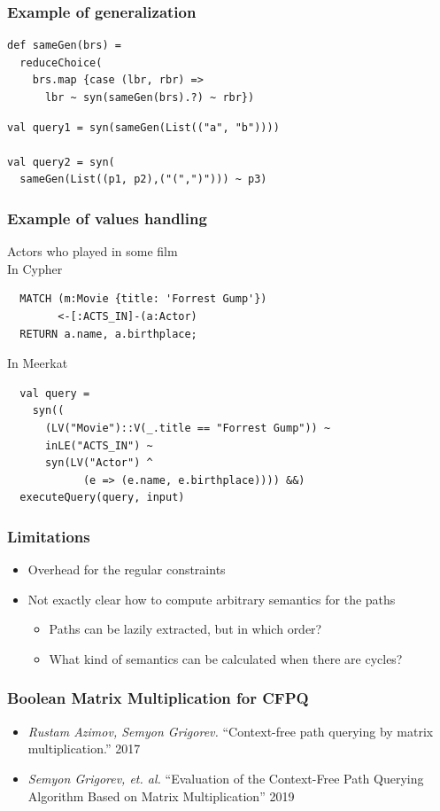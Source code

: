 \documentclass[xcolor=table]{beamer}
\begin{document}
\begin{frame}[fragile] \frametitle{Example of generalization}
  \lstset{language=scala}
\begin{lstlisting}
def sameGen(brs) =
  reduceChoice(
    brs.map {case (lbr, rbr) =>
      lbr ~ syn(sameGen(brs).?) ~ rbr})
\end{lstlisting}
\pause
\begin{lstlisting}
val query1 = syn(sameGen(List(("a", "b"))))

val query2 = syn(
  sameGen(List((p1, p2),("(",")"))) ~ p3)
\end{lstlisting}

\end{frame}

\begin{frame}[fragile] \frametitle{Example of values handling}
  \lstset{language=scala}
  Actors who played in some film
  \\ In Cypher
  \begin{lstlisting}
  MATCH (m:Movie {title: 'Forrest Gump'})
        <-[:ACTS_IN]-(a:Actor)
  RETURN a.name, a.birthplace;
  \end{lstlisting}
  \vspace{0.5cm}
  In Meerkat
  \\
  \begin{lstlisting}
  val query =
    syn((
      (LV("Movie")::V(_.title == "Forrest Gump")) ~
      inLE("ACTS_IN") ~
      syn(LV("Actor") ^
            (e => (e.name, e.birthplace)))) &&)
  executeQuery(query, input)
  \end{lstlisting}

\end{frame}

\begin{frame} \frametitle{Limitations}
\begin{itemize}
  \item Overhead for the regular constraints
  \item Not exactly clear how to compute arbitrary semantics for the paths
  \begin{itemize}
    \item Paths can be lazily extracted, but in which order?
    \item What kind of semantics can be calculated when there are cycles?
  \end{itemize}
\end{itemize}
\end{frame}

\begin{frame} \frametitle{Boolean Matrix Multiplication for CFPQ}
  \begin{itemize}
  \item \emph{Rustam Azimov, Semyon Grigorev.} ``Context-free path querying by matrix
    multiplication.'' 2017
  \item \emph{Semyon Grigorev, et. al.} ``Evaluation of the Context-Free Path Querying Algorithm
Based on Matrix Multiplication'' 2019
\end{itemize}
\end{frame}
\end{document}
